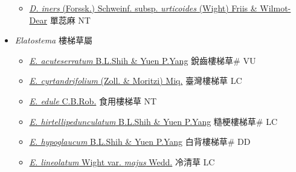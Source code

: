 \begin{itemize}
  \begin{itemize}
        \item[] \href{http://www.theplantlist.org/tpl1.1/search?q=Droguetia+iners+subsp.+urticoides}{\textit{D. iners} (Forssk.) Schweinf. subsp. \textit{urticoides} (Wight) Friis \& Wilmot-Dear}   單蕊麻 NT
  \end{itemize}
 \item[] \textit{Elatostema} 樓梯草屬
                    
  \begin{itemize}
        \item[] \href{http://www.theplantlist.org/tpl1.1/search?q=Elatostema+acuteserratum}{\textit{E. acuteserratum} B.L.Shih \& Yuen P.Yang}   銳齒樓梯草\# VU
        \item[] \href{http://www.theplantlist.org/tpl1.1/search?q=Elatostema+cyrtandrifolium}{\textit{E. cyrtandrifolium} (Zoll. \& Moritzi) Miq.}     臺灣樓梯草 LC
        \item[] \href{http://www.theplantlist.org/tpl1.1/search?q=Elatostema+edule}{\textit{E. edule} C.B.Rob.}   食用樓梯草 NT
        \item[] \href{http://www.theplantlist.org/tpl1.1/search?q=Elatostema+hirtellipedunculatum}{\textit{E. hirtellipedunculatum} B.L.Shih \& Yuen P.Yang}   糙梗樓梯草\# LC
        \item[] \href{http://www.theplantlist.org/tpl1.1/search?q=Elatostema+hypoglaucum}{\textit{E. hypoglaucum} B.L.Shih \& Yuen P.Yang}   白背樓梯草\# DD
        \item[] \href{http://www.theplantlist.org/tpl1.1/search?q=Elatostema+lineolatum+var.+majus}{\textit{E. lineolatum} Wight var. \textit{majus} Wedd.}   冷清草 LC

\end{itemize}
\end{itemize}
